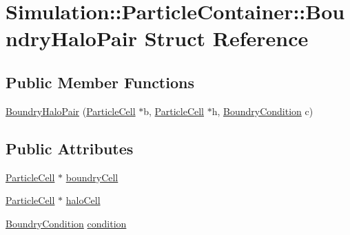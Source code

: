\hypertarget{structSimulation_1_1ParticleContainer_1_1BoundryHaloPair}{\section{Simulation\-:\-:Particle\-Container\-:\-:Boundry\-Halo\-Pair Struct Reference}
\label{structSimulation_1_1ParticleContainer_1_1BoundryHaloPair}
}
\subsection*{Public Member Functions}
\begin{DoxyCompactItemize}
\item 
\hyperlink{structSimulation_1_1ParticleContainer_1_1BoundryHaloPair_a8d8497916ad8912f01061eb54786c981}{Boundry\-Halo\-Pair} (\hyperlink{classSimulation_1_1ParticleCell}{Particle\-Cell} $\ast$b, \hyperlink{classSimulation_1_1ParticleCell}{Particle\-Cell} $\ast$h, \hyperlink{classSimulation_1_1ParticleContainer_a5bbfabc819c0011c6d446d0399d20330}{Boundry\-Condition} c)
\end{DoxyCompactItemize}
\subsection*{Public Attributes}
\begin{DoxyCompactItemize}
\item 
\hyperlink{classSimulation_1_1ParticleCell}{Particle\-Cell} $\ast$ \hyperlink{structSimulation_1_1ParticleContainer_1_1BoundryHaloPair_a94d8d53d4c93c7ce4a4ee86f71da886a}{boundry\-Cell}
\item 
\hyperlink{classSimulation_1_1ParticleCell}{Particle\-Cell} $\ast$ \hyperlink{structSimulation_1_1ParticleContainer_1_1BoundryHaloPair_aabcdae0bd0b5d88841a0a589f18403c8}{halo\-Cell}
\item 
\hyperlink{classSimulation_1_1ParticleContainer_a5bbfabc819c0011c6d446d0399d20330}{Boundry\-Condition} \hyperlink{structSimulation_1_1ParticleContainer_1_1BoundryHaloPair_a0b50969393c4c4aec8f74a3f7db2ec44}{condition}
\end{DoxyCompactItemize}


